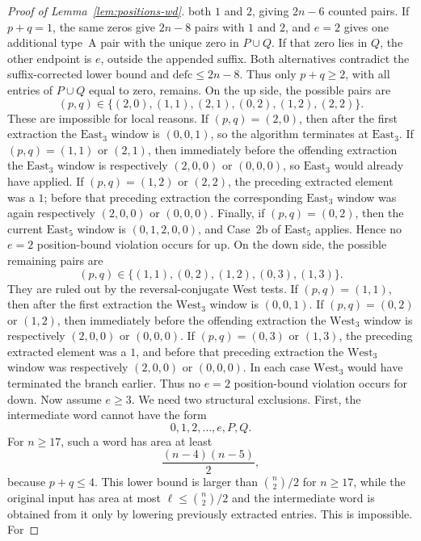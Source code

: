 \documentclass[11pt]{article}
\theoremstyle{plain}
\theoremstyle{definition}
\theoremstyle{remark}
\newcommand{\defc}{\mathrm{defc}}
\begin{document}
\begin{proof}[Proof of Lemma~\ref{lem:positions-wd}]
both \(1\) and \(2\), giving \(2n-6\) counted pairs.  If \(p+q=1\), the same
zeros give \(2n-8\) pairs with \(1\) and \(2\), and \(e=2\) gives one
additional type~A pair with the unique zero in \(P\cup Q\).  If that zero lies
in \(Q\), the other endpoint is \(e\), outside the appended suffix.  Both
alternatives contradict the suffix-corrected lower bound and
\(\defc\le 2n-8\).  Thus only \(p+q\ge 2\), with all entries of \(P\cup Q\)
equal to zero, remains.
On the \(\mathrm{up}\) side, the possible pairs are
\[
  (p,q)\in
  \{(2,0),(1,1),(2,1),(0,2),(1,2),(2,2)\}.
\]
These are impossible for local reasons.  If \((p,q)=(2,0)\), then after the
first extraction the \(\mathrm{East}_3\) window is \((0,0,1)\), so the
algorithm terminates at \(\mathrm{East}_3\).  If \((p,q)=(1,1)\) or
\((2,1)\), then immediately before the offending extraction the
\(\mathrm{East}_3\) window is respectively \((2,0,0)\) or \((0,0,0)\), so
\(\mathrm{East}_3\) would already have applied.  If \((p,q)=(1,2)\) or
\((2,2)\), the preceding extracted element was a \(1\); before that preceding
extraction the corresponding \(\mathrm{East}_3\) window was again respectively
\((2,0,0)\) or \((0,0,0)\).  Finally, if \((p,q)=(0,2)\), then the current
\(\mathrm{East}_5\) window is \((0,1,2,0,0)\), and Case~2b of
\(\mathrm{East}_5\) applies.  Hence no \(e=2\) position-bound violation occurs
for \(\mathrm{up}\).
On the \(\mathrm{down}\) side, the possible remaining pairs are
\[
  (p,q)\in\{(1,1),(0,2),(1,2),(0,3),(1,3)\}.
\]
They are ruled out by the reversal-conjugate West tests.  If
\((p,q)=(1,1)\), then after the first extraction the \(\mathrm{West}_3\)
window is \((0,0,1)\).  If \((p,q)=(0,2)\) or \((1,2)\), then immediately
before the offending extraction the \(\mathrm{West}_3\) window is respectively
\((2,0,0)\) or \((0,0,0)\).  If \((p,q)=(0,3)\) or \((1,3)\), the preceding
extracted element was a \(1\), and before that preceding extraction the
\(\mathrm{West}_3\) window was respectively \((2,0,0)\) or \((0,0,0)\).  In
each case \(\mathrm{West}_3\) would have terminated the branch earlier.  Thus
no \(e=2\) position-bound violation occurs for \(\mathrm{down}\).
Now assume \(e\ge 3\).  We need two structural exclusions.  First, the
intermediate word cannot have the form
\[
  0,1,2,\ldots,e,P,Q.
\]
For \(n\ge 17\), such a word has area at least
\[
  \frac{(n-4)(n-5)}2,
\]
because \(p+q\le 4\).  This lower bound is larger than
\(\binom n2/2\) for \(n\ge 17\), while the original input has area at most
\(\ell\le \binom n2/2\) and the intermediate word is obtained from it only by
lowering previously extracted entries.  This is impossible.  For

\end{proof}
\end{document}
